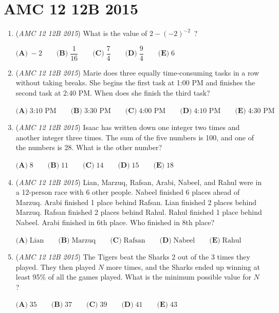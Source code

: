\section{AMC 12 12B 2015}
        \begin{enumerate}
        	\item (\textit{AMC 12 12B 2015}) What is the value of $2-(-2)^{-2}$ ?


 $\textbf{(A)}\; -2 \qquad\textbf{(B)}\; \dfrac{1}{16} \qquad\textbf{(C)}\; \dfrac{7}{4} \qquad\textbf{(D)}\; \dfrac{9}{4} \qquad\textbf{(E)}\; 6$


	\item (\textit{AMC 12 12B 2015}) Marie does three equally time-consuming tasks in a row without taking breaks. She begins the first task at 1:00 PM and finishes the second task at 2:40 PM. When does she finish the third task?


 $\textbf{(A)}\; \text{3:10 PM} \qquad\textbf{(B)}\; \text{3:30 PM} \qquad\textbf{(C)}\; \text{4:00 PM} \qquad\textbf{(D)}\; \text{4:10 PM} \qquad\textbf{(E)}\; \text{4:30 PM}$


	\item (\textit{AMC 12 12B 2015}) Isaac has written down one integer two times and another integer three times. The sum of the five numbers is 100, and one of the numbers is 28. What is the other number?


 $\textbf{(A)}\; 8 \qquad\textbf{(B)}\; 11 \qquad\textbf{(C)}\; 14 \qquad\textbf{(D)}\; 15 \qquad\textbf{(E)}\; 18$


	\item (\textit{AMC 12 12B 2015}) Lian, Marzuq, Rafsan, Arabi, Nabeel, and Rahul were in a 12-person race with 6 other people. Nabeel finished 6 places ahead of Marzuq. Arabi finished 1 place behind Rafsan. Lian finished 2 places behind Marzuq. Rafsan finished 2 places behind Rahul. Rahul finished 1 place behind Nabeel. Arabi finished in 6th place. Who finished in 8th place?


 $\textbf{(A)}\; \text{Lian} \qquad\textbf{(B)}\; \text{Marzuq} \qquad\textbf{(C)}\; \text{Rafsan} \qquad\textbf{(D)}\; \text{Nabeel} \qquad\textbf{(E)}\; \text{Rahul}$


	\item (\textit{AMC 12 12B 2015}) The Tigers beat the Sharks 2 out of the 3 times they played. They then played $N$ more times, and the Sharks ended up winning at least 95\% of all the games played. What is the minimum possible value for $N$?


 $\textbf{(A)}\; 35 \qquad  \textbf{(B)}\; 37 \qquad \textbf{(C)}\; 39 \qquad \textbf{(D)}\; 41 \qquad \textbf{(E)}\; 43$



\end{enumerate}
